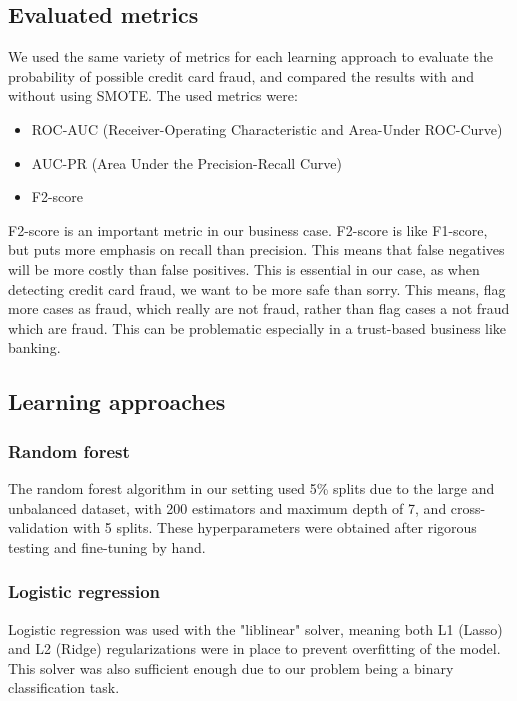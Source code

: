 \documentclass{article}
\begin{document}
\subsection{Evaluated metrics}

We used the same variety of metrics for each learning approach to evaluate the probability of possible credit card fraud, and compared the results with and without using SMOTE. The used metrics were:

\begin{itemize}
    \item ROC-AUC (Receiver-Operating Characteristic and Area-Under ROC-Curve)
    \item AUC-PR (Area Under the Precision-Recall Curve)
    \item F2-score
\end{itemize}

F2-score is an important metric in our business case. F2-score is like F1-score, but puts more emphasis on recall than precision. This means that false negatives will be more costly than false positives. This is essential in our case, as when detecting credit card fraud, we want to be more safe than sorry. This means, flag more cases as fraud, which really are not fraud, rather than flag cases a not fraud which are fraud. This can be problematic especially in a trust-based business like banking.

\subsection{Learning approaches}

\subsubsection{Random forest}

The random forest algorithm in our setting used 5\% splits due to the large and unbalanced dataset, with 200 estimators and maximum depth of 7, and cross-validation with 5 splits. These hyperparameters were obtained after rigorous testing and fine-tuning by hand.

\subsubsection{Logistic regression}

Logistic regression was used with the "liblinear" solver, meaning both L1 (Lasso) and L2 (Ridge) regularizations were in place to prevent overfitting of the model. This solver was also sufficient enough due to our problem being a binary classification task.
\end{document}
